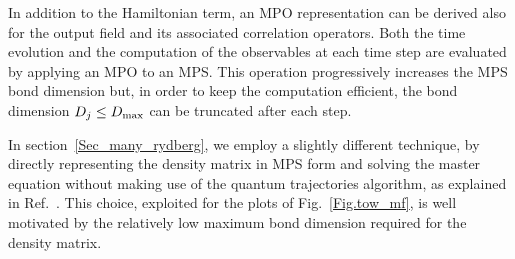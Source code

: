 \documentclass[pra,twocolumn,showpacs,preprintnumbers,amsmath,amssymb]{revtex4-1}
\begin{document}
In addition to the Hamiltonian term, an MPO representation can be derived also for the output field and its associated correlation operators.
Both the time evolution and the computation of the observables at each time step are evaluated by applying an MPO to an MPS. This operation progressively increases the MPS bond dimension 
but, in order to keep the computation efficient, the bond dimension $D_j\leq D_{\rm max}$ can be truncated after each step.

In section~\ref{Sec_many_rydberg}, we employ a slightly different technique, by directly representing the density matrix in MPS form and solving the master equation without making use of the quantum trajectories algorithm, as explained in Ref.~\cite{james_ryd}. This choice, exploited for the plots of Fig.~\ref{Fig.tow_mf}, is well motivated by the relatively low maximum bond dimension required for the density matrix.

\end{document}
